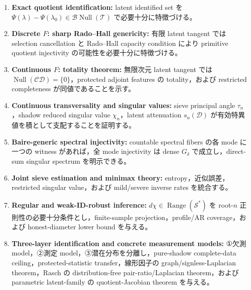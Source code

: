 \documentclass[11pt,a4paper]{ltjsarticle}
\theoremstyle{remark}
\newcommand{\Top}{\mathscr T}
\newcommand{\Bop}{\mathscr B}
\newcommand{\Sop}{\mathscr S}
\newcommand{\Cop}{\mathscr C}
\newcommand{\Jcal}{\mathscr D}
\newcommand{\Null}{\operatorname{Null}}
\newcommand{\Range}{\operatorname{Range}}
\begin{document}
\begin{tcolorbox}[colback=softgreen,colframe=deepgreen,boxrule=.7pt,arc=2mm,title=本稿の中心定理]
\begin{enumerate}[label=\textbf{T\arabic*.}]
\item \textbf{Exact quotient identification:} latent identified set を $\Psi(\lambda)-\Psi(\lambda_0)\in\Bop\Null(\Top)$ で必要十分に特徴づける。
\item \textbf{Discrete $F$: sharp Rado--Hall genericity:} 有限 latent tangent では selection cancellation と Rado--Hall capacity condition により primitive quotient injectivity の可能性を必要十分に特徴づける。
\item \textbf{Continuous $F$: totality theorem:} 無限次元 latent tangent では $\Null(\Cop\Jcal)=\{0\}$，protected adjoint features の totality，および restricted completeness が同値であることを示す。
\item \textbf{Continuous transversality and singular values:} sieve principal angle $\tau_n$，shadow reduced singular value $\chi_n$，latent attenuation $s_n(\Jcal)$ が有効特異値を積として支配することを証明する。
\item \textbf{Baire-generic spectral injectivity:} countable spectral fibers の各 mode に一つの witness があれば，全 mode injectivity は dense $G_\delta$ で成立し，direct-sum singular spectrum を明示できる。
\item \textbf{Joint sieve estimation and minimax theory:} entropy，近似誤差，restricted singular value，および mild/severe inverse rates を統合する。
\item \textbf{Regular and weak-ID-robust inference:} $d\chi\in\Range(\Sop^*)$ を root-$n$ 正則性の必要十分条件とし，finite-sample projection，profile/AR coverage，および honest-diameter lower bound を与える。
\item \textbf{Three-layer identification and concrete measurement models:} ①欠測 model，②測定 model，③潜在分布を分離し，pure-shadow complete-data ceiling，protected-statistic transfer，線形因子の graph/signless-Laplacian theorem，Rasch の distribution-free pair-ratio/Laplacian theorem，および parametric latent-family の quotient-Jacobian theorem を与える。
\end{enumerate}
\end{tcolorbox}
\end{document}
